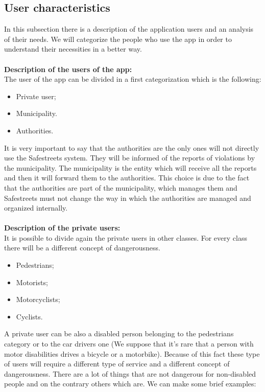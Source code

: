 \documentclass[titlepage]{article}
\begin{document}
\subsection{User characteristics}
In this subsection there is a description of the application users and an analysis of their needs. We will categorize the people who use the app in order to understand their necessities in a better way.\\
\textbf{\\Description of the users of the app:\\}
The user of the app can be divided in a first categorization which is the following:
\begin{itemize}
	\item Private user;
	\item Municipality.
	\item Authorities.\\
\end{itemize}
It is very important to say that the authorities are the only ones will not directly use the Safestreets system. They will be informed of the reports of violations by the municipality. The municipality is the entity which will receive all the reports and then it will forward them to the authorities. This choice is due to the fact that the authorities are part of the municipality, which manages them and Safestreets must not change the way in which the authorities are managed and organized internally. \\ \\
\textbf{Description of the private users: }\\ 
It is possible to divide again the private users in other classes. For every class there will be a different concept of dangerousness.
\begin{itemize}
	\item Pedestrians;
	\item Motorists;
	\item Motorcyclists;
	\item Cyclists.
\end{itemize}
A private user can be also a disabled person belonging to the pedestrians category or to the car drivers one (We suppose that it's rare that a person with motor disabilities drives a bicycle or a motorbike). Because of this fact these type of users will require a different type of service and a different concept of dangerousness. There are a lot of things that are not dangerous for non-disabled people and on the contrary others which are. We can make some brief examples: \\ \\
\end{document}
